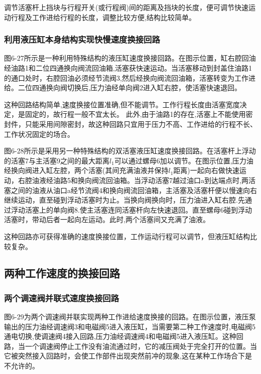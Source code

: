 调节活塞杆上挡块与行程开关(或行程阀)间的距离及挡块的长度，便可调节快速运动行程及工作进给行程的长度，调整比较方便,结构比较简单。

\subsubsection{利用液压缸本身结构实现快慢速度换接回路}

图6-27所示是一种利用特殊结构的液压缸速度换接回路。在图示位置，缸右腔回油经油路1和二位四通换向阀流回油箱,活塞获快速运动。当活塞移动到封盖住油路1的通口处时，右腔回油必须经节流阀3,然后经换向阀流回油箱，活塞转变为工作进给。二位四通换向阀切换后,压力油经单向阀2进入缸右腔，使活塞快速退回。

这种回路结构简单,速度换接位置准确,但不能调节。工作行程长度由活塞宽度决定，是固定的，故行程一般不宜太长。 此外,由于油路1的存在,活塞上不能使用密封件，只能采用间隙密封，故这种回路只宜用于压力不高、工作进给的行程不长、工作状况固定的场合。

图6-28所示是采用另一种特殊结构的双活塞液压缸速度换接回路。在活塞杆上浮动的活塞7与主活塞9之间的最大距离$l_{1}$可以通过螺母6加以调节。在图示位置,压力油经换向阀进入缸左腔，两个活塞(其间充满油液并保持$l_{1}$距离)一起向右做快速运动，右腔油液经油路5和换向阀流回油箱。当浮动活塞7越过油口a到达端点时,两活塞之间的油液从油口a经节流阀4和换向阀流回油箱，主活塞及活塞杆便以慢速向右继续运动，直至碰到浮动活塞时为止。当换向阀换向时，压力油进入缸右腔.先通过浮动活塞上的单向阀8.使主活塞连同活塞杆向左快速退回。直至螺母6碰到浮动活塞时，带动后者一起向左运动。此时,两个活塞间又充满了油液。

这种回路亦可获得准确的速度换接位置，工作运动行程可以调节，但液压缸结构比较复杂。

\subsection{两种工作速度的换接回路}

\subsubsection{两个调速阀并联式速度换接回路}

图6-29为两个调速阀并联实现两种工作进给速度换接的回路。在图示位置，液压泵输出的压力油经调速阀3和电磁阀5进入液压缸，当需要第二种工作速度时,电磁阀5通电切换,使调速阀4接入回路,压力油经调速阀4和电磁阀5进入液压缸。这种回路，当一个调速阀停止工作没有油流通过时，它的减压阀处于完全打开的位置。当它被突然接入回路时，会使工作部件出现突然前冲的现象,这在某种工作场合下是不允许的。


